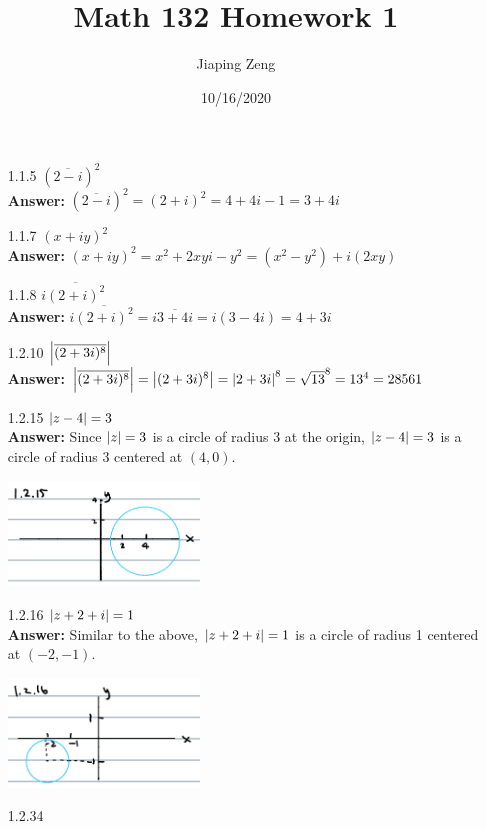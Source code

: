 \documentclass{article}
\title{Math 132 Homework 1}
\date{10/16/2020}
\author{Jiaping Zeng}
\begin{document}
\maketitle

\begin{itemize}
    \item [1.1.5] $(\overline{2-i})^2$\\
          \textbf{Answer: } $(\overline{2-i})^2=(2+i)^2=4+4i-1=3+4i$
    \item [1.1.7] $(x+iy)^2$\\
          \textbf{Answer: } $(x+iy)^2=x^2+2xyi-y^2=(x^2-y^2)+i(2xy)$
    \item [1.1.8] $i\overline{(2+i)^2}$\\
          \textbf{Answer: } $i\overline{(2+i)^2}=i\overline{3+4i}=i(3-4i)=4+3i$
    \item [1.2.10] $\abs{\overline{(2+3i)^8}}$\\
          \textbf{Answer: } $\abs{\overline{(2+3i)^8}}=\abs{(2+3i)^8}=\abs{2+3i}^8=\sqrt{13}^8=13^4=28561$
    \item [1.2.15] $\abs{z-4}=3$\\
          \textbf{Answer: } Since $\abs{z}=3$ is a circle of radius 3 at the origin, $\abs{z-4}=3$ is a circle of radius 3 centered at $(4,0)$.
          \begin{center}
              \includegraphics[width=2in]{1-2-15.png}
          \end{center}
    \item [1.2.16] $\abs{z+2+i}=1$\\
          \textbf{Answer: } Similar to the above, $\abs{z+2+i}=1$ is a circle of radius 1 centered at $(-2,-1)$.
          \begin{center}
              \includegraphics[width=2in]{1-2-16.png}
          \end{center}
    \item [1.2.34]

\end{itemize}
\end{document}
